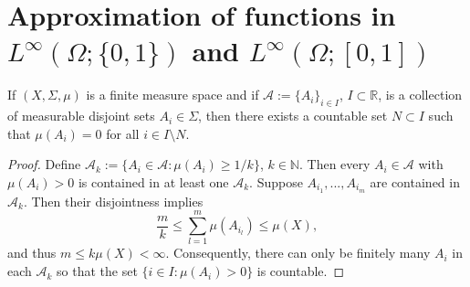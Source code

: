 \documentclass[reqno]{shinyart}
\begin{document}
\section{Approximation of functions in \texorpdfstring{$\scriptstyle L^\infty(\Omega;\{0,1\})$}{Lâ(Î©;{0,1})} and \texorpdfstring{$\scriptstyle L^\infty(\Omega;[0,1])$}{Lâ(Î©;[0,1])}}
\label{sec:approx}

\begin{lemma}\label{MassEffect}
    If $(X, \Sigma,\mu)$ is a finite measure space and if $\mathcal{A}:=\{A_i\}_{i \in I}$, 
    $I \subset {\mathbb{R}}$, is a collection of measurable disjoint sets $A_i \in \Sigma$,
    then there exists a countable set $N \subset I$ such that $\mu(A_i) = 0$ 
    for all $i \in I \setminus N$.
\end{lemma}

\begin{proof}
    Define $\mathcal{A}_k := \{ A_i \in \mathcal{A} : \mu(A_i)  \geq 1/k\}$, $k \in \mathbb{N}$. 
    Then every $A_i \in \mathcal{A}$ with $\mu(A_i) > 0$ is contained in at least one $\mathcal{A}_k$.  
    Suppose $A_{i_1},..., A_{i_m}$ are contained in $\mathcal{A}_k$. 
    Then their disjointness implies
    \begin{equation*}
        \frac{m}{k} \leq \sum_{l=1}^m \mu(A_{i_l}) \leq \mu(X),
    \end{equation*}  
    and thus $m \leq k \mu(X) < \infty$. Consequently, 
    there can only be finitely many $A_i$ in each $\mathcal{A}_k$ 
    so that the set $\{i \in I : \mu(A_i) > 0\}$ is countable.
\end{proof}
\end{document}
